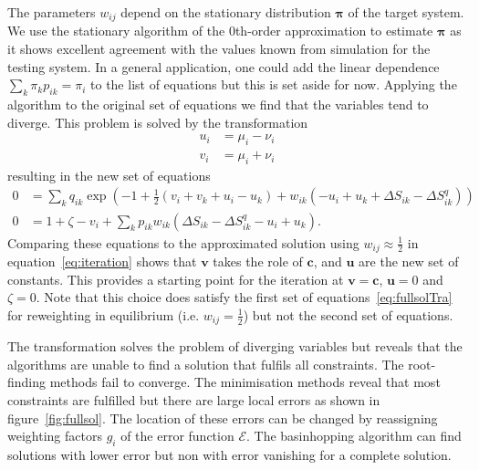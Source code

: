 The parameters $w_{ij}$ depend on the stationary distribution $\bm{\pi}$ of the target system. We use the stationary algorithm of the 0th-order approximation to estimate $\bm{\pi}$ as it shows excellent agreement with the values known from simulation for the testing system. In a general application, one could add 
the linear dependence $\sum_k \pi_k p_{ik} = \pi_i$ to the list of equations but this is set aside for now. Applying the algorithm to the original set of equations we find that the variables tend to diverge. This problem is solved by the transformation
\begin{equation}
 \begin{aligned}
  u_i &= \mu_i - \nu_i \\
  v_i &= \mu_i + \nu_i
 \end{aligned}
\end{equation}
resulting in the new set of equations
\begin{equation}
\begin{aligned}
0 &= \sum_k q_{ik} \exp \left ( -1 + \frac{1}{2} \left( v_i + v_k +u_i -u_k \right ) + w_{ik} \left( -u_i + u_k + \Delta S_{ik} - \Delta S^q_{ik} \right) \right ) \\
0 &= 1 + \zeta -v_i + \sum_k p_{ik} w_{ik} \left ( \Delta S_{ik} - \Delta S^q_{ik}  -u_i +u_k \right ) .
\end{aligned}
\label{eq:fullsolTra}
\end{equation}
Comparing these equations to the approximated solution using $w_{ij}\approx \frac{1}{2}$ in equation~\ref{eq:iteration} shows that $\bm{v}$ takes the role of $\bm{c}$, and $\bm{u}$ are the new set of constants. This provides a starting point for the iteration at $\bm{v}= \bm{c}$,  $\bm{u}=0$ and $\zeta =0$.  Note that this choice does satisfy the first set of equations~\ref{eq:fullsolTra} for reweighting in equilibrium (i.e. $w_{ij} = \frac{1}{2}$) but not the second set of equations. 

The transformation solves the problem of diverging variables but reveals that the algorithms are unable to find a solution that fulfils all constraints. The root-finding methods fail to converge. The minimisation methods reveal that most constraints are fulfilled but there are large local errors as shown in figure~\ref{fig:fullsol}. The location of these errors can be changed by reassigning weighting factors $g_i$ of the error function $\mathcal{E}$. The basinhopping algorithm can find solutions with lower error but non with error vanishing for a complete solution. 

